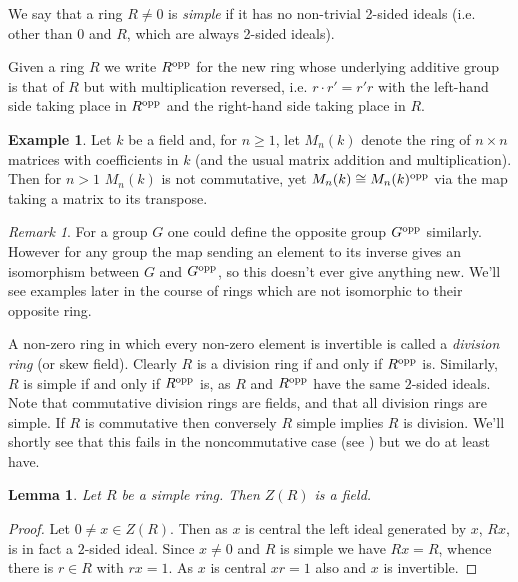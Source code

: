 \documentclass[11pt]{amsart}
\numberwithin{equation}{section}
\newtheorem{lemma}[equation]{Lemma}
\theoremstyle{remark}
\newtheorem{remark}[equation]{Remark}
\theoremstyle{remark}
\theoremstyle{remark}
\theoremstyle{definition}
\newtheorem{example}[equation]{Example}
\theoremstyle{definition}
\theoremstyle{definition}
\theoremstyle{definition}
\theoremstyle{definition}
\theoremstyle{definition}
\begin{document}
 We say that a ring $R\neq 0$ is \textit{simple} if it has no non-trivial 2-sided ideals (i.e. other than $0$ and $R$, which are always 2-sided ideals). 
 
 Given a ring $R$ we write $R^\textup{opp}$ for the new ring whose underlying additive group is that of $R$ but with multiplication reversed, i.e. $r\cdot r'=r'r$ with the left-hand side taking place in $R^\textup{opp}$ and the right-hand side taking place in $R$. 
 
 \begin{example} \label{matrix is self-opposite}
 Let $k$ be a field and, for $n\geq 1$, let $M_n(k)$ denote the ring of $n\times n$ matrices with coefficients in $k$ (and the usual matrix addition and multiplication). Then for $n> 1$ $M_n(k)$ is not commutative, yet $M_n(k)\cong M_n(k)^{\textup{opp}}$ via the map taking a matrix to its transpose.
 \end{example}
 
 \begin{remark}
 For a  group $G$ one could define the opposite group $G^\textup{opp}$ similarly. However for any group the map sending an element to its inverse gives an isomorphism between $G$ and $G^\textup{opp}$, so this doesn't ever give anything new. We'll see examples later in the course of rings which are not isomorphic to their opposite ring.   
 \end{remark}
 
 A non-zero ring in which every non-zero element is invertible is called a \textit{division ring} (or skew field). Clearly $R$ is a division ring if and only if $R^\textup{opp}$ is. Similarly, $R$ is simple if and only if $R^\textup{opp}$ is, as $R$ and $R^{\textup{opp}}$ have the same $2$-sided ideals. Note that commutative division rings are fields, and that all division rings are simple.   If $R$ is commutative then conversely $R$ simple implies $R$ is division.  We'll shortly see that this fails in the noncommutative case (see ) but we do at least have. 
 
 \begin{lemma} \label{centre is a field}
 Let $R$ be a simple ring. Then $Z(R)$ is a field.
 \end{lemma}
 
 \begin{proof}
 Let $0\neq x\in Z(R)$. Then as $x$ is central the left ideal generated by $x$, $Rx$, is in fact a $2$-sided ideal. Since $x\neq 0$ and $R$ is simple we have $Rx=R$, whence there is $r\in R$ with $rx=1$. As $x$ is central $xr=1$ also and $x$ is invertible.
 \end{proof}
\end{document}
